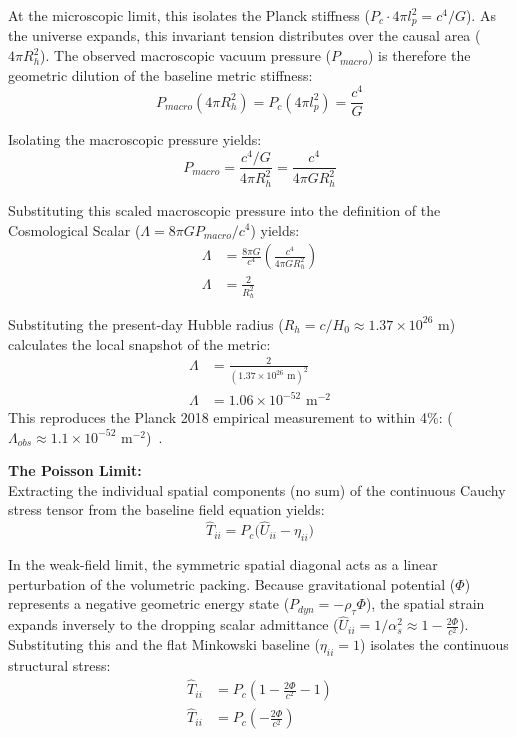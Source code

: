 At the microscopic limit, this isolates the Planck stiffness ($P_c \cdot 4\pi l_p^2 = c^4/G$). As the universe expands, this invariant tension distributes over the causal area ($4\pi R_h^2$). The observed macroscopic vacuum pressure ($P_{macro}$) is therefore the geometric dilution of the baseline metric stiffness: 
\begin{equation}
    P_{macro} (4\pi R_h^2) = P_c (4\pi l_p^2) = \frac{c^4}{G}
\end{equation}

Isolating the macroscopic pressure yields:
\begin{equation}
    P_{macro} = \frac{c^4/G}{4\pi R_h^2} = \frac{c^4}{4\pi G R_h^2} 
\end{equation}

Substituting this scaled macroscopic pressure into the definition of the Cosmological Scalar ($\Lambda = 8\pi G P_{macro} / c^4$) yields: 
\begin{align}
    \Lambda &= \frac{8\pi G}{c^4} \left( \frac{c^4}{4\pi G R_h^2} \right) \nonumber \\
    \Lambda &= \frac{2}{R_h^2} \label{eq:tensor_cosmological_constant}
\end{align}

Substituting the present-day Hubble radius ($R_h = c / H_0 \approx 1.37 \times 10^{26} \text{ m}$) calculates the local snapshot of the metric: 
\begin{align}
    \Lambda &= \frac{2}{(1.37 \times 10^{26} \text{ m})^2} \nonumber \\
    \Lambda &= 1.06 \times 10^{-52} \text{ m}^{-2} \label{eq:lambda_numerical}
\end{align}
This reproduces the Planck 2018 empirical measurement to within 4\%:  ($\Lambda_{obs} \approx 1.1 \times 10^{-52} \text{ m}^{-2}$)~\cite{Planck2018}. 

\vspace{0.2 cm}

\textbf{The Poisson Limit:}\\

Extracting the individual spatial components (no sum) of the continuous Cauchy stress tensor from the baseline field equation yields:
\begin{equation}
    \hat{T}_{ii} = P_c \Big( \hat{U}_{ii} - \eta_{ii} \Big)
\end{equation}

In the weak-field limit, the symmetric spatial diagonal acts as a linear perturbation of the volumetric packing. Because gravitational potential ($\Phi$) represents a negative geometric energy state ($P_{dyn} = -\rho_\tau \Phi$), the spatial strain expands inversely to the dropping scalar admittance ($\hat{U}_{ii} = 1/\alpha_s^2 \approx 1 - \frac{2\Phi}{c^2}$). 
Substituting this and the flat Minkowski baseline ($\eta_{ii} = 1$) isolates the continuous structural stress: 
\begin{align}
    \hat{T}_{ii} &= P_c \left( 1 - \frac{2\Phi}{c^2} - 1 \right) \nonumber \\ 
    \hat{T}_{ii} &= P_c \left( - \frac{2\Phi}{c^2} \right) 
\end{align}

